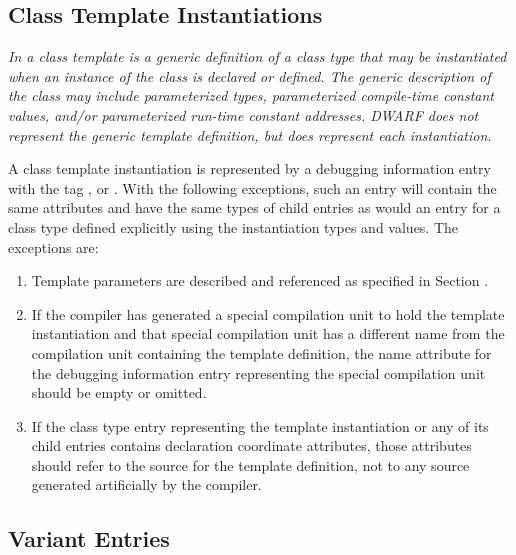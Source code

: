 \subsection{Class Template Instantiations}
\label{chap:classtemplateinstantiations}

\textit{In  a class template is a generic definition of a class
type that may be instantiated when an instance of the class
is declared or defined. The generic description of the class may include
parameterized types, parameterized compile-time constant
values, and/or parameterized run-time constant addresses. 
DWARF does not represent the generic template
definition, but does represent each instantiation.}

A class template instantiation is represented by a
debugging information entry with the tag \DWTAGclasstype,
\DWTAGstructuretype{} or 
\DWTAGuniontype. With the following
exceptions, such an entry will contain the same attributes
and have the same types of child entries as would an entry
for a class type defined explicitly using the instantiation
types and values. The exceptions are:

\begin{enumerate}[1. ]
\item Template parameters are described and referenced as
specified in Section .

\item If the compiler has generated a special compilation unit to
hold the 
template instantiation and that special compilation
unit has a different name from the compilation unit containing
the template definition, the name attribute for the debugging
information entry representing the special compilation unit
should be empty or omitted.

\item If the class type entry representing the template
instantiation or any of its child entries contains declaration
coordinate attributes, those attributes should refer to
the source for the template definition, not to any source
generated artificially by the compiler.
\end{enumerate}


\subsection{Variant Entries}
\label{chap:variantentries}

